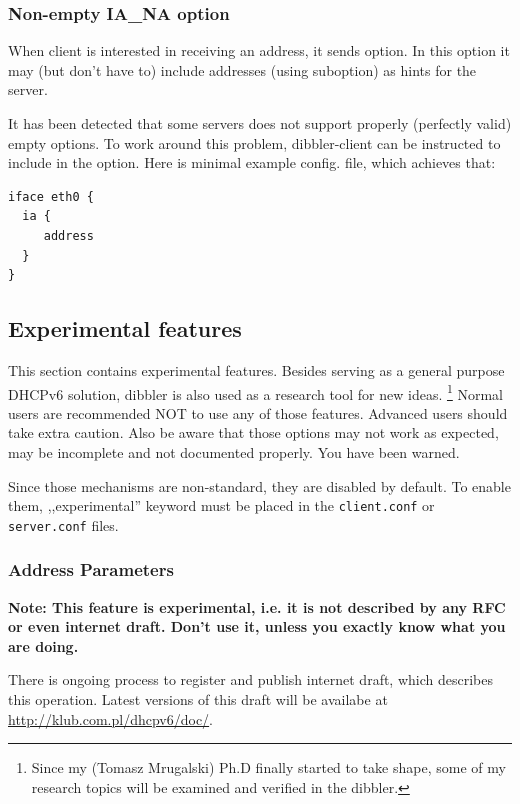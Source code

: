 \subsubsection{Non-empty IA\_NA option}
When client is interested in receiving an address, it sends
 option. In this option it may (but don't have to) include
addresses (using  suboption) as hints for the server.

It has been detected that some servers does not support properly
(perfectly valid) empty  options. To work around this
problem, dibbler-client can be instructed to include  in
the  option. Here is minimal example config. file, which
achieves that:

\begin{lstlisting}
iface eth0 {
  ia {
     address
  } 
}
\end{lstlisting}

\subsection{Experimental features}

This section contains experimental features. Besides serving as a
general purpose DHCPv6 solution, dibbler is also used as a research
tool for new ideas. \footnote{Since my (Tomasz Mrugalski) Ph.D finally
started to take shape, some of my research topics will be examined and
verified in the dibbler.} Normal users are recommended NOT to use any
of those features. Advanced users should take extra caution. Also be
aware that those options may not work as expected, may be incomplete
and not documented properly. You have been warned.

Since those mechanisms are non-standard, they are disabled by
default. To enable them, ,,experimental'' keyword must be placed in
the \verb+client.conf+ or \verb+server.conf+ files.

\subsubsection{Address Parameters}

\textbf{Note: This feature is experimental, i.e. it is not described
by any RFC or even internet draft. Don't use it, unless you exactly
know what you are doing.}

There is ongoing process to register and publish internet draft,
which describes this operation. Latest versions of this draft will be
availabe at \url{http://klub.com.pl/dhcpv6/doc/}.

